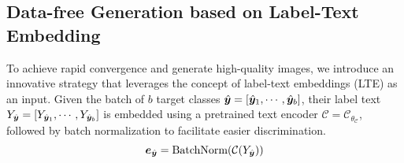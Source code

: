 \documentclass{article} %
\begin{document}
\subsection{Data-free Generation based on Label-Text Embedding}
To achieve rapid convergence and generate high-quality images, we introduce an innovative strategy that leverages the concept of label-text embeddings (LTE) as an input. Given the batch of $b$ target classes $\hat{{\bm{y}}} = [\hat{{\bm{y}}}_1,\cdots,\hat{{\bm{y}}}_b]$, their label text $Y_{\hat{{\bm{y}}}} = [Y_{\hat{{\bm{y}}}_1},\cdots,Y_{\hat{{\bm{y}}}_b}]$ is embedded using a pretrained text encoder $\mathcal{C} = \mathcal{C}_{\theta_\mathcal{C}}$, followed by batch normalization to facilitate easier discrimination. 
\begin{equation}
    {\bm{e}}_{\hat{{\bm{y}}}} = \text{BatchNorm}(\mathcal{C}(Y_{\hat{{\bm{y}}}}))
    \label{eq:ey}
\end{equation}
\end{document}
